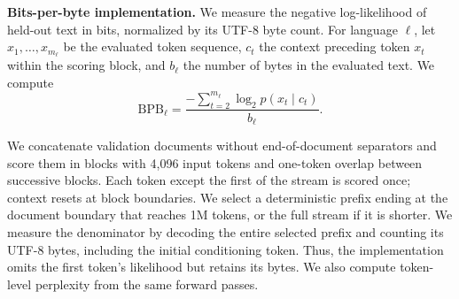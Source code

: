 \textbf{Bits-per-byte implementation.} We measure the negative log-likelihood of held-out text in bits, normalized by its UTF-8 byte count.
For language $\ell$, let $x_1,\ldots,x_{m_\ell}$ be the evaluated token sequence, $c_t$ the context preceding token $x_t$ within the scoring block, and $b_\ell$ the number of bytes in the evaluated text. We compute
\begin{equation}
\mathrm{BPB}_\ell = \frac{-\sum_{t=2}^{m_\ell}\log_2 p(x_t \mid c_t)}{b_\ell}.
\label{eq:bpb}
\end{equation}

We concatenate validation documents without end-of-document separators and score them in blocks with 4,096 input tokens and one-token overlap between successive blocks. Each token except the first of the stream is scored once; context resets at block boundaries. We select a deterministic prefix ending at the document boundary that reaches 1M tokens, or the full stream if it is shorter. We measure the denominator by decoding the entire selected prefix and counting its UTF-8 bytes, including the initial conditioning token. Thus, the implementation omits the first token's likelihood but retains its bytes. We also compute token-level perplexity from the same forward passes.



